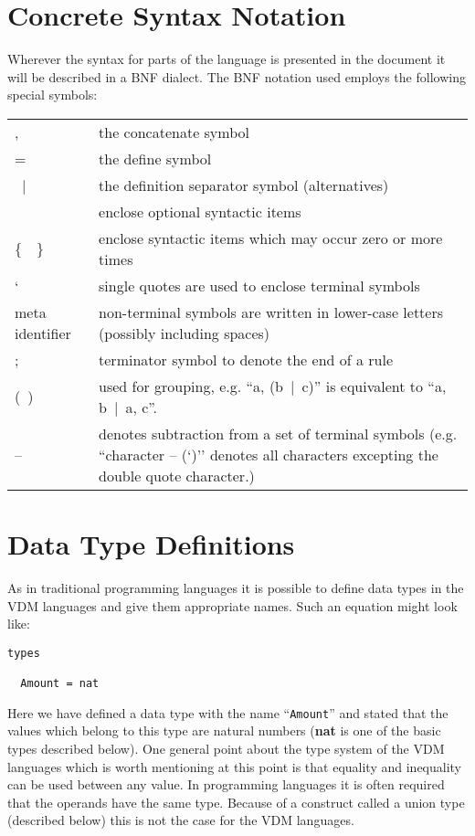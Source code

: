 \documentclass{overturerepchap}
\newcommand{\Lit}[1]{`{\tt #1}\Quote}
\newcommand{\SeqPt}[1]{\{\ #1\ \}}
\newcommand{\dsepl}{\ $|$\ }
\newcommand{\keyw}[1]{{\bf\ttfamily #1}}
\newcommand{\OptPt}[1]{[\ #1\ ]}
\begin{document}
\chapter{Concrete Syntax Notation}
\label{syntax-notation}


Wherever the syntax for parts of the language is presented in the
document it will be described in a BNF dialect. The BNF notation
used employs the following special symbols:

\newcommand{\singleQuote}{\texttt{\symbol{34}}}
\begin{tabular}{l@{\hspace{1cm}}p{10cm}}
  , &  the concatenate symbol \\
  = & the define symbol \\
  \dsepl & the definition separator symbol (alternatives)\\
  \OptPt{} & enclose optional syntactic items \\
  \SeqPt{} & enclose syntactic items which may occur zero or more times \\
  \Lit{ } & single quotes are used to enclose terminal symbols \\
    meta identifier & non-terminal symbols are written in lower-case letters
    (possibly including spaces) \\
  ;  & terminator symbol to denote the end of a rule \\
  (\ ) & used for grouping, e.g. ``a, (b\dsepl c)'' is equivalent to
    ``a, b\dsepl a, c''. \\
  -- & denotes subtraction from a set of terminal symbols
    (e.g. ``character -- (\Lit{\singleQuote})'' denotes all characters
    excepting the double quote character.)
\end{tabular}

\chapter{Data Type Definitions}
\label{typedef}

As in traditional programming languages it is possible to define data
types in the VDM languages and give them appropriate names.
Such an equation might look like:

\begin{lstlisting}
types

  Amount = nat
\end{lstlisting}

Here we have defined a data type with the name ``{\tt Amount}'' and
stated that the values which belong to this type are natural numbers
(\keyw{nat} is one of the basic types described below). One general
point about the type system of the VDM languages which is
worth mentioning at this point is that equality and inequality can be
used between any value. In programming languages it is often required
that the operands have the same type. Because of a
construct called a union type (described below) this is not the case
for the VDM languages.
\end{document}
